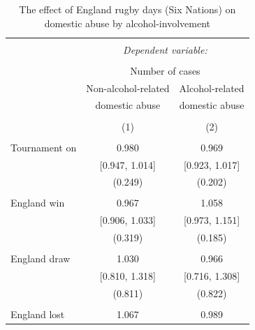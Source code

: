 \documentclass[12pt, a4paper]{article}
\begin{document}



\begin{table}[!htbp] \centering
  \begin{threeparttable}
  \caption{The effect of England rugby days (Six Nations) on domestic abuse by alcohol-involvement}
  \label{rugby}
\begin{tabular}{@{\extracolsep{5pt}}lcc}
\\[-1.8ex]\hline
\hline \\[-1.8ex]
 & \multicolumn{2}{c}{\textit{Dependent variable:}} \\
\cline{2-3}
\\[-1.8ex] & \multicolumn{2}{c}{Number of cases} \\
 & Non-alcohol-related & Alcohol-related\\
 & domestic abuse & domestic abuse\\
\\[-1.8ex] & (1) & (2)\\
\hline \\[-1.8ex]
Tournament on & 0.980 & 0.969 \\
  & [0.947, 1.014] & [0.923, 1.017] \\
  & (0.249) & (0.202) \\
  & & \\
 England win & 0.967 & 1.058 \\
  & [0.906, 1.033] & [0.973, 1.151] \\
  & (0.319) & (0.185) \\
  & & \\
 England draw & 1.030 & 0.966 \\
  & [0.810, 1.318] & [0.716, 1.308] \\
  & (0.811) & (0.822) \\
  & & \\
 England lost & 1.067 & 0.989 \\

\end{tabular}
\end{threeparttable}
\end{table}
\end{document}
